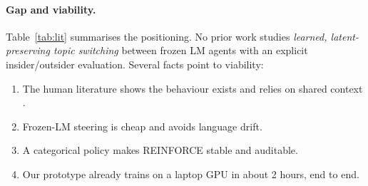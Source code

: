 \documentclass[10pt,a4paper,twocolumn]{article}
\newcommand{\1}{\mathbb{1}}
\begin{document}
\begin{table}[t]
\centering\footnotesize
\setlength{\tabcolsep}{2.2pt}
\caption{Positioning. ``Insider ctx'': what the receiver shares with the sender beyond the message. ``Outsider eval'': how the eavesdropper is modelled.}
\label{tab:lit}
\end{table}

\paragraph{Gap and viability.} Table~\ref{tab:lit} summarises the positioning.
No prior work studies \emph{learned, latent-preserving topic switching} between frozen LM agents with an explicit insider/outsider evaluation. Several facts point to viability:
\begin{enumerate}
\item The human literature shows the behaviour exists and relies on shared context \citep{clark1987concealing}.
\item Frozen-LM steering is cheap and avoids language drift.
\item A categorical policy makes REINFORCE stable and auditable.
\item Our prototype already trains on a laptop GPU in about 2 hours, end to end.
\end{enumerate}
\end{document}
